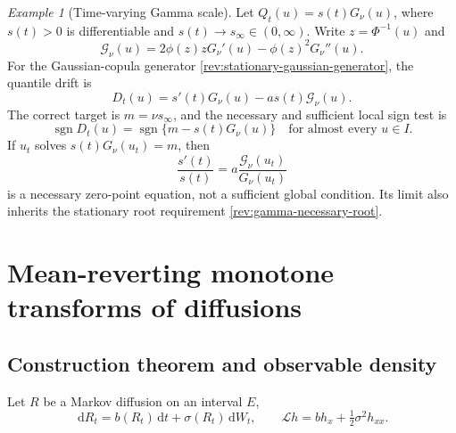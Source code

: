 \documentclass[11pt]{article}
\theoremstyle{remark}
\newtheorem{example}[definition]{Example}
\newcommand{\dd}{\,\mathrm d}
\newcommand{\sgn}{\operatorname{sgn}}
\begin{document}
\begin{example}[Time-varying Gamma scale]
\label{rev:ex-gamma-timevarying}
Let $Q_t(u)=s(t)G_\nu(u)$, where $s(t)>0$ is differentiable and
$s(t)\to s_\infty\in(0,\infty)$.  Write $z=\Phi^{-1}(u)$ and
\begin{equation}
\mathscr G_\nu(u)=2\phi(z)zG_\nu'(u)-\phi(z)^2G_\nu''(u).
\label{rev:gamma-G}
\end{equation}
For the Gaussian-copula generator \eqref{rev:stationary-gaussian-generator},
the quantile drift is
\begin{equation}
D_t(u)=s'(t)G_\nu(u)-a s(t)\mathscr G_\nu(u).
\label{rev:gamma-time-drift}
\end{equation}
The correct target is $m=\nu s_\infty$, and the necessary and sufficient local
sign test is
\begin{equation}
\sgn D_t(u)=\sgn\{m-s(t)G_\nu(u)\}
\quad\text{for almost every }u\in I.
\label{rev:gamma-time-full-sign}
\end{equation}
If $u_t$ solves $s(t)G_\nu(u_t)=m$, then
\begin{equation}
\frac{s'(t)}{s(t)}
=a\frac{\mathscr G_\nu(u_t)}{G_\nu(u_t)}
\label{rev:gamma-time-necessary-ode}
\end{equation}
is a necessary zero-point equation, not a sufficient global condition.  Its
limit also inherits the stationary root requirement
\eqref{rev:gamma-necessary-root}.
\end{example}

\section{Mean-reverting monotone transforms of diffusions}

\subsection{Construction theorem and observable density}

Let $R$ be a Markov diffusion on an interval $E$,
\begin{equation}
\dd R_t=b(R_t)\dd t+\sigma(R_t)\dd W_t,
\qquad
\mathcal Lh=b h_x+\tfrac12\sigma^2 h_{xx}.
\label{rev:base-diffusion}
\end{equation}
\end{document}
